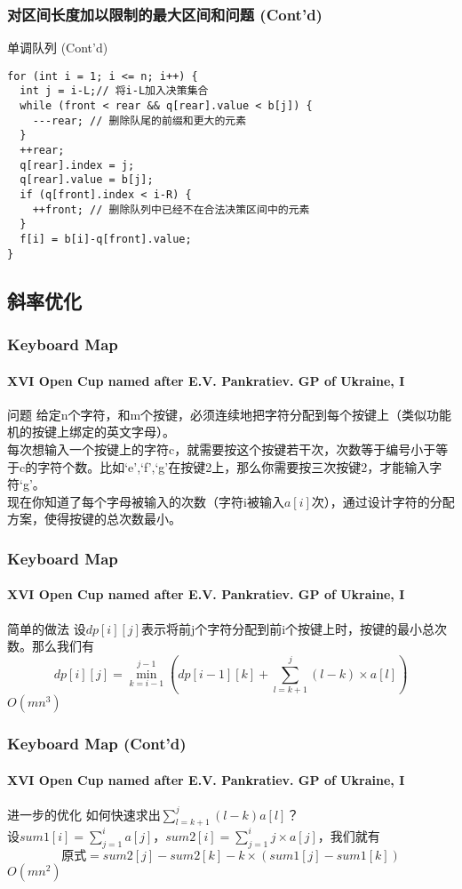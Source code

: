 \documentclass[hyperref={unicode=true}]{beamer}
\theoremstyle{definition}
\theoremstyle{proof}
\begin{document}
\begin{frame}[fragile]\frametitle{对区间长度加以限制的最大区间和问题 (Cont'd)}
  \begin{exampleblock}{单调队列 (Cont'd)}
    \begin{verbatim}
for (int i = 1; i <= n; i++) {
  int j = i-L;// 将i-L加入决策集合
  while (front < rear && q[rear].value < b[j]) {
    ---rear; // 删除队尾的前缀和更大的元素
  }
  ++rear;
  q[rear].index = j;
  q[rear].value = b[j];
  if (q[front].index < i-R) {
    ++front; // 删除队列中已经不在合法决策区间中的元素
  }
  f[i] = b[i]-q[front].value;
}
    \end{verbatim}
  \end{exampleblock}
\end{frame}

\subsection{斜率优化}
\begin{frame}\frametitle{Keyboard Map}
  \framesubtitle{XVI Open Cup named after E.V. Pankratiev. GP of Ukraine, I}
  \begin{block}{问题}
    给定n个字符，和m个按键，必须连续地把字符分配到每个按键上（类似功能机的按键上绑定的英文字母）。\\
    每次想输入一个按键上的字符c，就需要按这个按键若干次，次数等于编号小于等于c的字符个数。比如`e',`f',`g'在按键2上，那么你需要按三次按键2，才能输入字符`g'。\\
    现在你知道了每个字母被输入的次数（字符i被输入$a[i]$次），通过设计字符的分配方案，使得按键的总次数最小。
  \end{block}
\end{frame}

\begin{frame}\frametitle{Keyboard Map}
  \framesubtitle{XVI Open Cup named after E.V. Pankratiev. GP of Ukraine, I}
  \begin{alertblock}{简单的做法}
    设$dp[i][j]$表示将前j个字符分配到前i个按键上时，按键的最小总次数。那么我们有
    \[dp[i][j] = \min_{k=i-1}^{j-1}{(dp[i-1][k] + \sum_{l=k+1}^{j}(l-k)\times a[l])}\]
    $O(mn^3)$
  \end{alertblock}
\end{frame}

\begin{frame}\frametitle{Keyboard Map (Cont'd)}
  \framesubtitle{XVI Open Cup named after E.V. Pankratiev. GP of Ukraine, I}
  \begin{alertblock}{进一步的优化}
    如何快速求出$\sum_{l=k+1}^{j}(l-k)a[l]$？\\
    \pause{}设$sum1[i] = \sum_{j=1}^i a[j]$，$sum2[i] = \sum_{j=1}^i{j}\times a[j]$，我们就有
    \[\text{原式}=sum2[j]-sum2[k]-k \times (sum1[j]-sum1[k])\]
    $O(mn^2)$
  \end{alertblock}
\end{frame}
\end{document}
